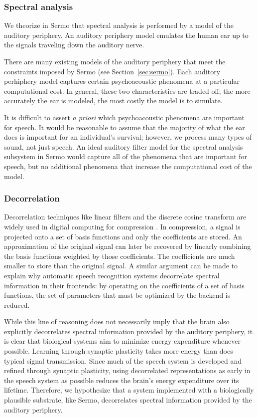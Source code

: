 \subsubsection{Spectral analysis}

We theorize in Sermo that spectral analysis
is performed by a model
of the auditory periphery.
An auditory periphery model
emulates the human ear
up to the signals
traveling down the auditory nerve.

There are many existing
models of the auditory periphery
that meet the constraints
imposed by Sermo (see Section~\ref{sec:sermo}).
Each auditory perhiphery model
captures certain psychoacoustic phenomena
at a particular computational cost.
In general, these two characteristics
are traded off;
the more accurately the ear is modeled,
the most costly the model is to simulate.

It is difficult to assert \textit{a priori}
which psychoacoustic phenomena
are important for speech.
It would be reasonable to assume that
the majority of what the ear does
is important for an individual's survival;
however, we process many types of sound,
not just speech.
An ideal auditory filter model
for the spectral analysis subsystem
in Sermo
would capture all of the phenomena
that are important for speech,
but no additional phenomena
that increase the computational cost
of the model.

\subsubsection{Decorrelation}

Decorrelation techniques like
linear filters and the discrete cosine transform
are widely used in digital computing
for compression \citep{khayam2003}.
In compression, a signal is projected
onto a set of basis functions
and only the coefficients are stored.
An approximation of the original signal
can later be recovered by linearly combining
the basis functions weighted by those coefficients.
The coefficients are much smaller
to store than the original signal.
A similar argument can be made
to explain why automatic speech recognition systems
decorrelate spectral information in their frontends:
by operating on the coefficients of a set
of basis functions,
the set of parameters that must be optimized
by the backend is reduced.

While this line of reasoning
does not necessarily imply that
the brain also explicitly decorrelates
spectral information
provided by the auditory periphery,
it is clear that biological systems
aim to minimize energy expenditure whenever possible.
Learning through synaptic plasticity
takes more energy than does
typical signal transmission.
Since much of the speech system
is developed and refined
through synaptic plasticity,
using decorrelated representations
as early in the speech system as possible
reduces the brain's energy expenditure
over its lifetime.
Therefore, we hypothesize
that a system implemented
with a biologically plausible substrate,
like Sermo,
decorrelates spectral information
provided by the auditory periphery.

